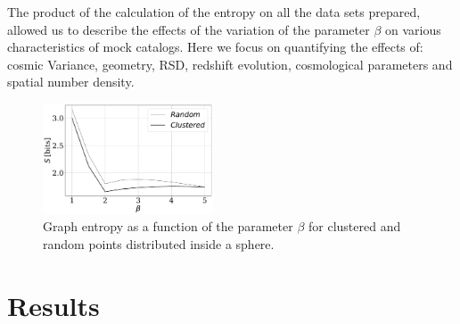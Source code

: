 \documentclass[fleqn,usenatbib]{mnras}
\begin{document}
The product of the calculation of the entropy on all the data sets prepared, allowed us to
describe the effects of the variation of the parameter $\beta$ on various characteristics
of mock catalogs. 
Here we focus on quantifying the effects of: cosmic Variance, geometry, RSD, redshift
evolution, cosmological parameters and spatial number density.


\begin{figure}
    \includegraphics[width=0.45\textwidth]{entropy.pdf}
    \caption{Graph entropy as a function of the parameter $\beta$ 
    for clustered and random points distributed inside a sphere. \label{fig:entropy}}
\end{figure}




\section{Results}
\label{sec:results}
\end{document}
